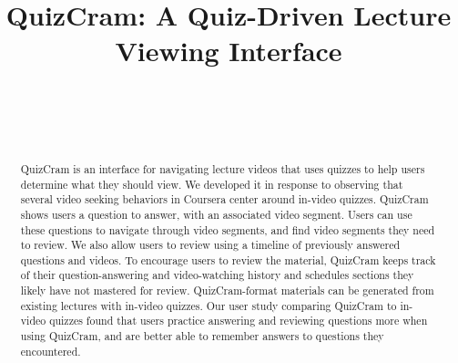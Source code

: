 \documentclass{sigchi}
\begin{document}
\title{QuizCram: A Quiz-Driven Lecture Viewing Interface}

\author{%
  \\
  \\
  \\
}

\maketitle


\begin{abstract}
QuizCram is an interface for navigating lecture videos that uses quizzes to help users determine what they should view.
We developed it in response to observing that several video seeking behaviors in Coursera center around in-video quizzes.
QuizCram shows users a question to answer, with an associated video segment.
Users can use these questions to navigate through video segments, and find video segments they need to review.
We also allow users to review using a timeline of previously answered questions and videos.
To encourage users to review the material, QuizCram keeps track of their question-answering and video-watching history and schedules sections they likely have not mastered for review.
QuizCram-format materials can be generated from existing lectures with in-video quizzes.
Our user study comparing QuizCram to in-video quizzes found that users
practice answering and reviewing questions more when using QuizCram, and
are better able to remember answers to questions they encountered.
\end{abstract}
\end{document}
